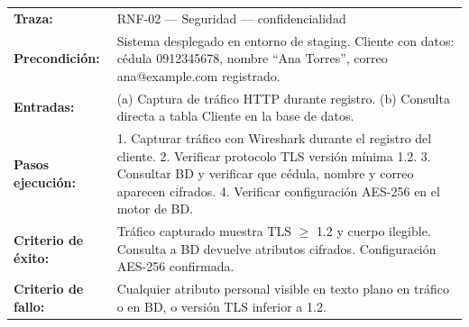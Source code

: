\documentclass{article}
\begin{document}
\begin{tcolorbox}[colback=white, colframe=black, boxrule=0.5pt, sharp corners, 
  title={}, breakable]

\medskip
\begin{tabularx}{\linewidth}{@{}l X@{}}
\textbf{Traza:}              & RNF-02 — Seguridad — confidencialidad \\
\textbf{Precondición:}       & Sistema desplegado en entorno de staging. Cliente con datos: cédula 0912345678, nombre ``Ana Torres'', correo ana@example.com registrado. \\
\textbf{Entradas:}           & (a) Captura de tráfico HTTP durante registro. (b) Consulta directa a tabla Cliente en la base de datos. \\
\textbf{Pasos ejecución:}    & 1. Capturar tráfico con Wireshark durante el registro del cliente. 2. Verificar protocolo TLS versión mínima 1.2. 3. Consultar BD y verificar que cédula, nombre y correo aparecen cifrados. 4. Verificar configuración AES-256 en el motor de BD. \\
\textbf{Criterio de éxito:}  & Tráfico capturado muestra TLS $\geq$ 1.2 y cuerpo ilegible. Consulta a BD devuelve atributos cifrados. Configuración AES-256 confirmada. \\
\textbf{Criterio de fallo:}  & Cualquier atributo personal visible en texto plano en tráfico o en BD, o versión TLS inferior a 1.2. \\
\end{tabularx}
\end{tcolorbox}
\newpage
\end{document}
